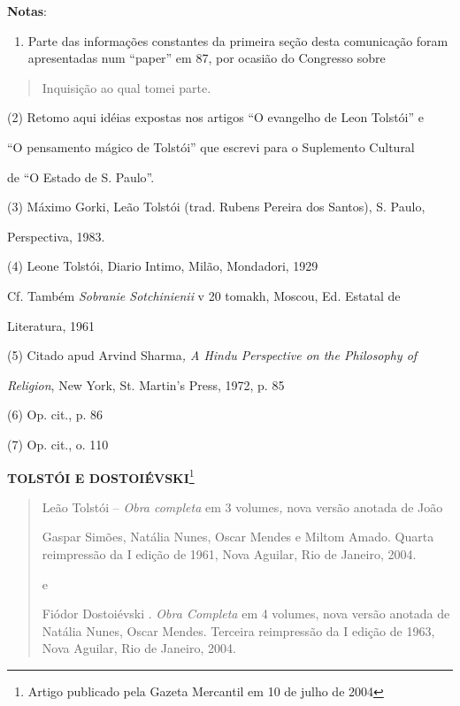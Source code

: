 \textbf{{Notas}}:

\begin{enumerate}
\def\labelenumi{(\arabic{enumi})}
\item
  Parte das informações constantes da primeira seção desta comunicação
  foram apresentadas num ``paper'' em 87, por ocasião do Congresso sobre
\end{enumerate}

\begin{quote}
Inquisição ao qual tomei parte.
\end{quote}

(2) Retomo aqui idéias expostas nos artigos ``O evangelho de Leon
Tolstói'' e

``O pensamento mágico de Tolstói'' que escrevi para o Suplemento
Cultural

de ``O Estado de S. Paulo''.

(3) Máximo Gorki, Leão Tolstói (trad. Rubens Pereira dos Santos), S.
Paulo,

Perspectiva, 1983.

(4) Leone Tolstói, Diario Intimo, Milão, Mondadori, 1929

Cf. Também \emph{Sobranie Sotchinienii} v 20 tomakh, Moscou, Ed. Estatal
de

Literatura, 1961

(5) Citado apud Arvind Sharma\emph{, A Hindu Perspective on the
Philosophy of }

\emph{Religion}, New York, St. Martin's Press, 1972, p. 85

(6) Op. cit., p. 86

(7) Op. cit., o. 110

\textbf{TOLSTÓI E DOSTOIÉVSKI}\footnote{Artigo publicado pela Gazeta
  Mercantil em 10 de julho de 2004}

\begin{quote}
Leão Tolstói -- \emph{Obra completa} em 3 volumes\emph{,} nova versão
anotada de João

Gaspar Simões, Natália Nunes, Oscar Mendes e Miltom Amado. Quarta
reimpressão da I edição de 1961, Nova Aguilar, Rio de Janeiro, 2004.

e

Fiódor Dostoiévski . \emph{Obra Completa} em 4 volumes, nova versão
anotada de Natália Nunes, Oscar Mendes. Terceira reimpressão da I edição
de 1963, Nova Aguilar, Rio de Janeiro, 2004.
\end{quote}


